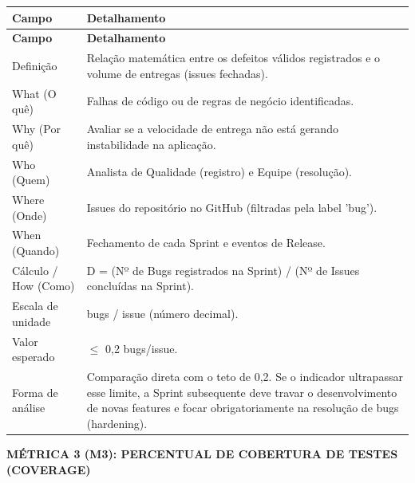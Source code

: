 \begingroup
\small
\setlength{\tabcolsep}{4pt}
\renewcommand{\arraystretch}{1.2}
\begin{longtable}{|>{\raggedright\arraybackslash}p{}|>{\raggedright\arraybackslash}p{}|}
\hline
\textbf{Campo} & \textbf{Detalhamento} \\ \hline
\endfirsthead
\textbf{Campo} & \textbf{Detalhamento} \\ \hline
\endhead
Definição & Relação matemática entre os defeitos válidos registrados e o volume de entregas (issues fechadas). \\ \hline
What (O quê) & Falhas de código ou de regras de negócio identificadas. \\ \hline
Why (Por quê) & Avaliar se a velocidade de entrega não está gerando instabilidade na aplicação. \\ \hline
Who (Quem) & Analista de Qualidade (registro) e Equipe (resolução). \\ \hline
Where (Onde) & Issues do repositório no GitHub (filtradas pela label 'bug'). \\ \hline
When (Quando) & Fechamento de cada Sprint e eventos de Release. \\ \hline
Cálculo / How (Como) & D = (Nº de Bugs registrados na Sprint) / (Nº de Issues concluídas na Sprint). \\ \hline
Escala de unidade & bugs / issue (número decimal). \\ \hline
Valor esperado & $\leq$ 0,2 bugs/issue. \\ \hline
Forma de análise & Comparação direta com o teto de 0,2. Se o indicador ultrapassar esse limite, a Sprint subsequente deve travar o desenvolvimento de novas features e focar obrigatoriamente na resolução de bugs (hardening). \\ \hline
\end{longtable}
\endgroup

\textbf{MÉTRICA 3 (M3): PERCENTUAL DE COBERTURA DE TESTES (COVERAGE)}

